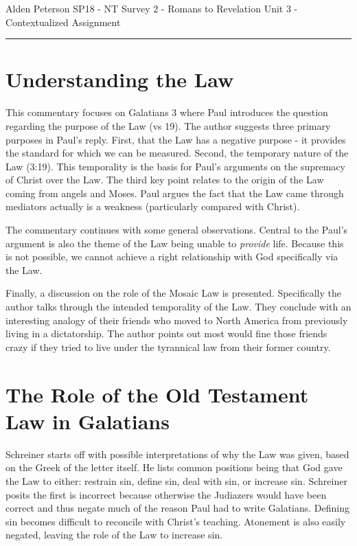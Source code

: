 \documentclass[12pt]{turabian-researchpaper}
\begin{document}
\begin{singlespace}
\noindent Alden Peterson \newline
\noindent SP18 - NT Survey 2 - Romans to Revelation\newline
\noindent Unit 3 - Contextualized Assignment
\newline\noindent\rule{4cm}{0.4pt}
\end{singlespace}



\section{Understanding the Law\autocite{gatewayLaw17}}

This commentary focuses on Galatians 3 where Paul introduces the question regarding the purpose of the Law (vs 19). The author suggests three primary purposes in Paul's reply. First, that the Law has a negative purpose - it provides the standard for which we can be measured. Second, the temporary nature of the Law (3:19). This temporality is the basis for Paul's arguments on 
the supremacy of Christ over the Law. The third key point relates to the origin of the Law coming from angels and Moses. Paul argues the fact that the Law came through mediators actually is a weakness (particularly compared with Christ). 

The commentary continues with some general observations. Central to the Paul's argument is also the theme of the Law being unable to \textit{provide} life. Because this is not possible, we cannot achieve a right relationship with God specifically via the Law.

Finally, a discussion on the role of the Mosaic Law is presented. Specifically the author talks through the intended temporality of the Law. They conclude with an interesting analogy of their friends who moved to North America from previously living in a dictatorship. The author points out most would fine those friends crazy if they tried to live under the tyrannical law from their former country.

\section{The Role of the Old Testament Law in Galatians\autocite{schreiner17}}

Schreiner starts off with possible interpretations of why the Law was given, based on the Greek of the letter itself. He lists common positions being that God gave the Law to either: restrain sin, define sin, deal with sin, or increase sin. Schreiner posits the first is incorrect because otherwise the Judiazers would have been correct and thus negate much of the reason Paul had to write Galatians. Defining sin becomes difficult to reconcile with Christ's teaching. Atonement is also easily negated, leaving the role of the Law to increase sin.
\end{document}
